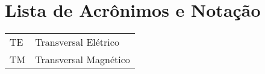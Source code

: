 
\chapter*{Lista de Acrônimos e Notação}

\begin{tabular}{ll}
TE  & Transversal Elétrico\\
TM & Transversal Magnético\\
\end{tabular}

\vspace*{1cm}

